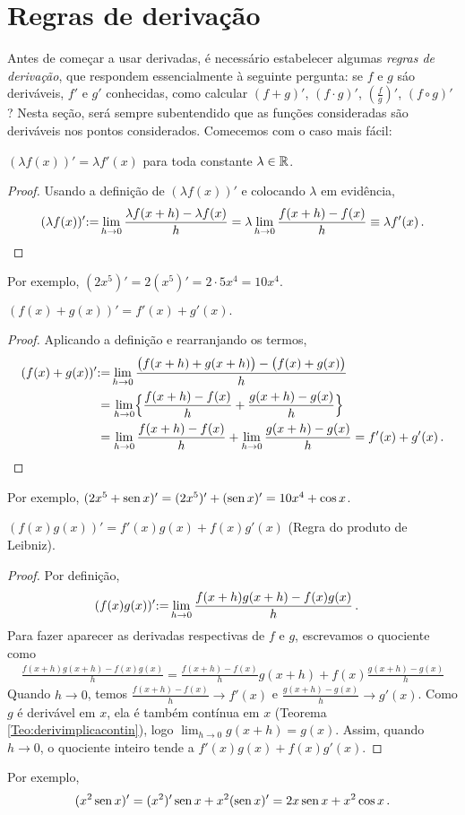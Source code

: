 \section{Regras de derivação}\label{Sec:regrasdederivacao}
Antes de começar a usar derivadas, é necessário estabelecer algumas 
\emph{regras
de derivação}, que respondem essencialmente à seguinte pergunta: se $f$ e $g$
sáo deriváveis, $f'$ e $g'$ conhecidas, como calcular $(f+g)'$, $(f\cdot 
g)'$,
$(\frac{f}{g})'$, $(f\circ g)'$? 
Nesta seção, será sempre subentendido que as funções consideradas são
deriváveis nos pontos considerados. Comecemos com o caso mais fácil:

\begin{regra}
$\boxed{(\lambda f(x))'=\lambda f'(x)}$ para toda constante $\lambda\in \mathbb{R}$.
\end{regra}
\begin{proof} Usando a definição de $(\lambda f(x))'$  e colocando $\lambda$ em
evidência,
$$(\lambda f(x))'{:=}\lim_{h\to 0}\frac{\lambda f(x+h)-\lambda f(x)}{h}=
\lambda\lim_{h\to 0}\frac{ f(x+h)-f(x)}{h}\equiv \lambda f'(x)\,.
$$ 
\end{proof}
Por exemplo, $(2x^5)'=2(x^5)'=2\cdot 5x^4=10 x^4$.

\begin{regra}
 $\boxed{(f(x)+g(x))'=f'(x)+g'(x).}$
\end{regra}
\begin{proof}
Aplicando a definição e rearranjando os termos,
 \begin{align*}
(f(x)+g(x))'&{:=} \lim_{h\to
0}\frac{\bigl(f(x+h)+g(x+h)\bigr)-\bigl(f(x)+g(x)\bigr)}{h}\\
&=\lim_{h\to
0}\Bigl\{\frac{f(x+h)-f(x)}{h}+\frac{g(x+h)-g(x)}{h}\Bigr\}\\
&=\lim_{h\to
0}\frac{f(x+h)-f(x)}{h}+\lim_{h\to
0}\frac{g(x+h)-g(x)}{h}=f'(x)+g'(x)\,.
\end{align*}
\end{proof}
Por exemplo, $(2x^5+\operatorname{sen} x)'=(2x^5)'+(\operatorname{sen} x)'=10x^4+\cos x$.

\begin{regra}
 $\boxed{(f(x)g(x))'=f'(x)g(x)+f(x)g'(x)}$ (Regra do produto de Leibniz).
\end{regra}
\begin{proof}
 Por definição, 
\begin{align*}
(f(x)g(x))'&{:=} \lim_{h\to
0}\frac{f(x+h)g(x+h)-f(x)g(x)}{h}\,.
\end{align*}
Para fazer aparecer as derivadas respectivas de $f$ e $g$, escrevamos o
quociente como
\begin{align*}
\frac{f(x+h)g(x+h)-f(x)g(x)}{h}
={\frac{f(x+h)-f(x)}{h}}g(x+h)+f(x){\frac{g(x+h)-g(x)}{
h}}
\end{align*}
Quando $h\to 0$, temos $\frac{f(x+h)-f(x)}{h}\to
f'(x)$ e $\frac{g(x+h)-g(x)}{ h}\to g'(x)$.
Como $g$ é derivável em $x$, ela é também contínua em $x$
(Teorema \ref{Teo:derivimplicacontin}), logo $\lim_{h\to 0}g(x+h)=g(x)$. Assim,
quando $h\to 0$, o quociente inteiro tende a $f'(x)g(x)+f(x)g'(x)$.
\end{proof}
Por exemplo, 
\[(x^2\operatorname{sen} x)'=(x^2)'\operatorname{sen} x+x^2(\operatorname{sen} x)'=2x\operatorname{sen} x+x^2\cos x\,.\]

